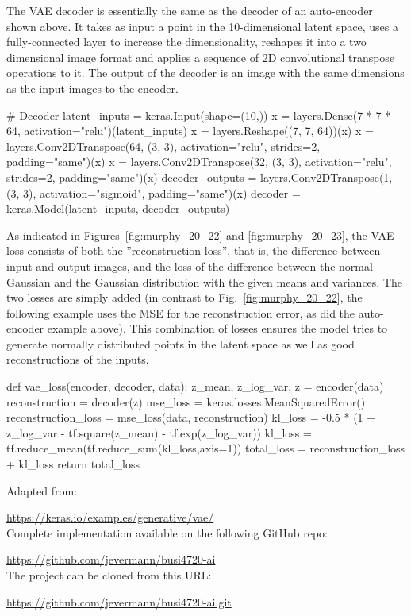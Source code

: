 The VAE decoder is essentially the same as the decoder of an auto-encoder shown above. It takes as input a point in the 10-dimensional latent space, uses a fully-connected layer to increase the dimensionality, reshapes it into a two dimensional image format and applies a sequence of 2D convolutional transpose operations to it. The output of the decoder is an image with the same dimensions as the input images to the encoder.

\begin{pythoncode}
# Decoder
latent_inputs = keras.Input(shape=(10,))
x = layers.Dense(7 * 7 * 64, activation="relu")(latent_inputs)
x = layers.Reshape((7, 7, 64))(x)
x = layers.Conv2DTranspose(64, (3, 3), activation="relu", 
             strides=2, padding="same")(x)
x = layers.Conv2DTranspose(32, (3, 3), activation="relu", 
             strides=2, padding="same")(x)
decoder_outputs = layers.Conv2DTranspose(1, (3, 3), 
             activation="sigmoid", padding="same")(x)
decoder = keras.Model(latent_inputs, decoder_outputs)
\end{pythoncode}

As indicated in Figures~\ref{fig:murphy_20_22} and \ref{fig:murphy_20_23}, the VAE loss consists of both the ''reconstruction loss'', that is, the difference between input and output images, and the loss of the difference between the normal Gaussian and the Gaussian distribution with the given means and variances. The two losses are simply added (in contrast to Fig.~\ref{fig:murphy_20_22}, the following example uses the MSE for the reconstruction error, as did the auto-encoder example above). This combination of losses ensures the model tries to generate normally distributed points in the latent space as well as good reconstructions of the inputs.

\begin{pythoncode}
def vae_loss(encoder, decoder, data):
    z_mean, z_log_var, z = encoder(data)
    reconstruction = decoder(z)
    mse_loss = keras.losses.MeanSquaredError()
    reconstruction_loss = mse_loss(data, reconstruction)
    kl_loss = -0.5 * (1 +
                      z_log_var -
                      tf.square(z_mean) -
                      tf.exp(z_log_var))
    kl_loss = tf.reduce_mean(tf.reduce_sum(kl_loss,axis=1))
    total_loss = reconstruction_loss + kl_loss
    return total_loss
\end{pythoncode}

\begin{resourcebox}
Adapted from: 

\small\url{https://keras.io/examples/generative/vae/}\normalsize \\

Complete implementation available on the following GitHub repo:

\small\url{https://github.com/jevermann/busi4720-ai}\normalsize \\

The project can be cloned from this URL:

\small\url{https://github.com/jevermann/busi4720-ai.git}\normalsize
\end{resourcebox}



